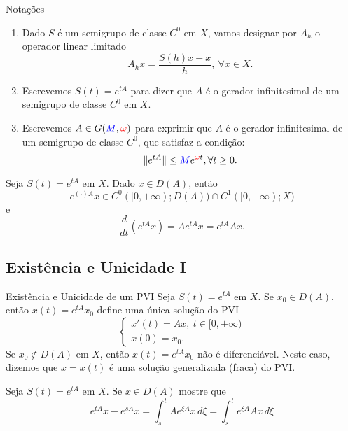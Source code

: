 \begin{frame}{ }
\begin{exampleblock}{Notações}
\begin{enumerate}
    \item Dado $S$ é um semigrupo de classe $C^0$ em $X$, vamos designar por $A_h$ o operador linear limitado 
    \[A_hx=\frac{S(h)x-x}{h},\ \forall x\in X.\]
\item Escrevemos $S(t)=e^{tA}$ para dizer que $A$ é o gerador infinitesimal de um semigrupo de classe $C^0$ em $X$.
\item Escrevemos $A\in G({\color{blue}M},{\color{red}\omega})$ para exprimir que $A$ é o gerador infinitesimal de um semigrupo de classe $C^0$, que satisfaz a condição:
\[\|e^{tA}\|\leq {\color{blue} M}e^{{\color{red}\omega} t}, \forall t\geq 0.\]
\end{enumerate}
\end{exampleblock}
\end{frame}

\begin{frame}{ }
\begin{teo}
Seja $S(t)=e^{tA}$ em $X$. Dado $x\in D(A)$, então 
\[e^{(\cdot)A}x\in C^0([0,+\infty);D(A))\cap C^1([0,+\infty);X)\]
e
\[\frac{d}{dt}\left(e^{tA}x\right)=Ae^{tA}x=e^{tA}Ax.\]
\end{teo}
\end{frame}
\subsection*{Existência e Unicidade I}
\begin{frame}{ }
\begin{exampleblock}{Existência e Unicidade de um PVI}
Seja $S(t)=e^{tA}$ em $X$. Se {\color{red}$x_0\in D(A)$}, então $x(t)=e^{tA}x_0$ define {\color{blue}uma única solução} do PVI
\[
\begin{cases}
    x'(t)=Ax,\ t\in [0,+\infty)\\
    x(0)=x_0.
\end{cases}
\]
Se {\color{red}$x_0\not\in D(A)$} em $X$, então $x(t)=e^{tA}x_0$ {\color{red}não é diferenciável}. Neste caso, dizemos que $x=x(t)$ é uma {\color{blue}solução generalizada (fraca)} do PVI.
\end{exampleblock}

\begin{exer}
Seja $S(t)=e^{tA}$ em $X$. Se $x\in D(A)$ mostre que
\[e^{tA}x-e^{sA}x=\int_s^t Ae^{\xi A}x\,d\xi =\int_s^t e^{\xi A}Ax\,d\xi\]
\end{exer}
\end{frame}

